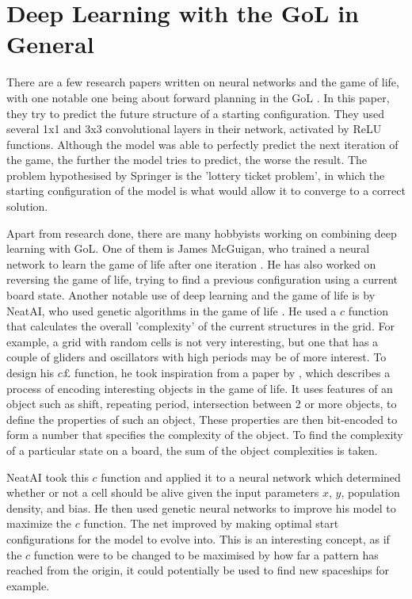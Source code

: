 \documentclass{l4proj}
\begin{document}
\section{Deep Learning with the GoL in General}

There are a few research papers written on neural networks and the game of life, with one notable one being about forward planning in the GoL \citep{game_of_life_dl_is_hard}. In this paper, they try to predict the future structure of a starting configuration. They used several 1x1 and 3x3 convolutional layers in their network, activated by ReLU functions. Although the model was able to perfectly predict the next iteration of the game, the further the model tries to predict, the worse the result. The problem hypothesised by Springer is the 'lottery ticket problem', in which the starting configuration of the model is what would allow it to converge to a correct solution. 

Apart from research done, there are many hobbyists working on combining deep learning with GoL. One of them is James McGuigan, who trained a neural network to learn the game of life after one iteration \citep{james}. He has also worked on reversing the game of life, trying to find a previous configuration using a current board state. Another notable use of deep learning and the game of life is by NeatAI, who used genetic algorithms in the game of life \citep{neatai_gol}. He used a $c$ function that calculates the overall 'complexity' of the current structures in the grid. For example, a grid with random cells is not very interesting, but one that has a couple of gliders and oscillators with high periods may be of more interest. To design his $c£$ function, he took inspiration from a paper by \citep{algorithmic_specified_complexity}, which describes a process of encoding interesting objects in the game of life. It uses features of an object such as shift, repeating period, intersection between 2 or more objects, to define the properties of such an object, These properties are then bit-encoded to form a number that specifies the complexity of the object. To find the complexity of a particular state on a board, the sum of the object complexities is taken.

NeatAI took this $c$ function and applied it to a neural network which determined whether or not a cell should be alive given the input parameters $x$, $y$, population density, and bias. He then used genetic neural networks to improve his model to maximize the $c$ function. The net improved by making optimal start configurations for the model to evolve into. This is an interesting concept, as if the $c$ function were to be changed to be maximised by how far a pattern has reached from the origin, it could potentially be used to find new spaceships for example.
\end{document}
